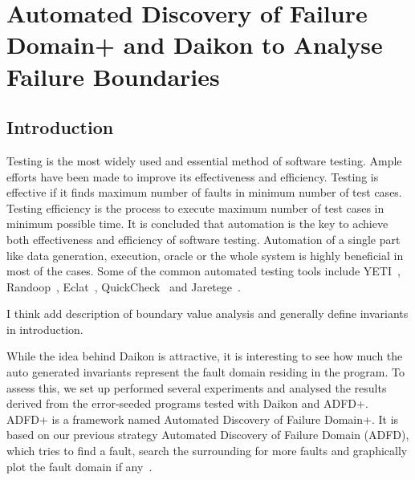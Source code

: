 \chapter{Automated Discovery of Failure Domain+ and Daikon to Analyse Failure Boundaries}
\label{chap:ADFD+}



\section{Introduction}\label{sec:intro6}
Testing is the most widely used and essential method of software testing. Ample efforts have been made to improve its effectiveness and efficiency. Testing is effective if it finds maximum number of faults in minimum number of test cases. Testing efficiency is the process to execute maximum number of test cases in minimum possible time. It is concluded that automation is the key to achieve both effectiveness and efficiency of software testing. Automation of a single part like data generation, execution, oracle or the whole system is highly beneficial in most of the cases. Some of the common automated testing tools include YETI~\cite{Oriol2011yeti}, Randoop~\cite{pacheco2007randoop}, Eclat~\cite{pacheco2005eclat}, QuickCheck~\cite{claessen2011quickcheck} and Jaretege~\cite{oriat2005jartege}. 


I think add description of boundary value analysis and generally define invariants in introduction.




While the idea behind Daikon is attractive, it is interesting to see how much the auto generated invariants represent the fault domain residing in the program. To assess this, we set up performed several experiments and analysed the results derived from the error-seeded programs tested with Daikon and ADFD+. ADFD+ is a framework named Automated Discovery of Failure Domain+. It is based on our previous strategy Automated Discovery of Failure Domain (ADFD), which tries to find a fault, search the surrounding for more faults and graphically plot the fault domain if any~\cite{ahmad2013adfd}.  

